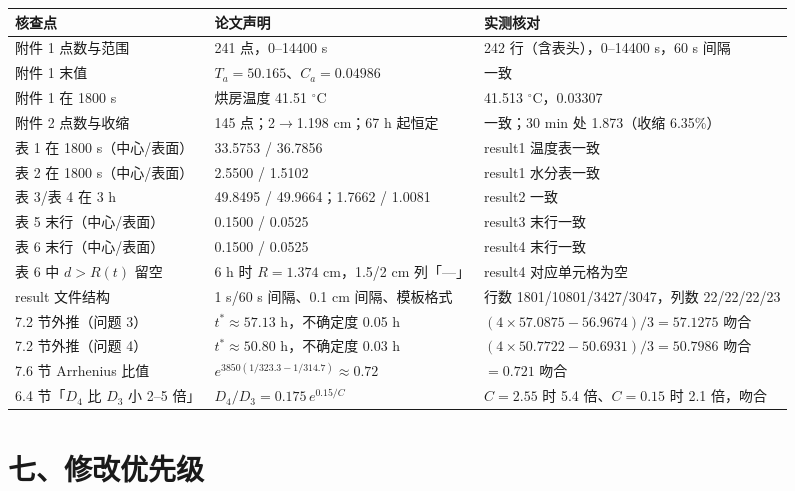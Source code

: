 \documentclass[12pt,a4paper]{ctexart}
\begin{document}
\begin{center}
{\begin{tabular}{p{6.6cm}ll}
\toprule
核查点 & 论文声明 & 实测核对 \\
\midrule
附件 1 点数与范围 & 241 点，0--14400 s & 242 行（含表头），0--14400 s，60 s 间隔 \\
附件 1 末值 & $T_a=50.165$、$C_a=0.04986$ & 一致 \\
附件 1 在 1800 s & 烘房温度 41.51 $^\circ$C & 41.513 $^\circ$C，0.03307 \\
附件 2 点数与收缩 & 145 点；2$\to$1.198 cm；67 h 起恒定 & 一致；30 min 处 1.873（收缩 6.35\%） \\
表 1 在 1800 s（中心/表面） & 33.5753 / 36.7856 & result1 温度表一致 \\
表 2 在 1800 s（中心/表面） & 2.5500 / 1.5102 & result1 水分表一致 \\
表 3/表 4 在 3 h & 49.8495 / 49.9664；1.7662 / 1.0081 & result2 一致 \\
表 5 末行（中心/表面） & 0.1500 / 0.0525 & result3 末行一致 \\
表 6 末行（中心/表面） & 0.1500 / 0.0525 & result4 末行一致 \\
表 6 中 $d>R(t)$ 留空 & 6 h 时 $R=1.374$ cm，1.5/2 cm 列「---」 & result4 对应单元格为空 \\
result 文件结构 & 1 s/60 s 间隔、0.1 cm 间隔、模板格式 & 行数 1801/10801/3427/3047，列数 22/22/22/23 \\
7.2 节外推（问题 3） & $t^*\approx57.13$ h，不确定度 0.05 h & $(4\times57.0875-56.9674)/3=57.1275$ 吻合 \\
7.2 节外推（问题 4） & $t^*\approx50.80$ h，不确定度 0.03 h & $(4\times50.7722-50.6931)/3=50.7986$ 吻合 \\
7.6 节 Arrhenius 比值 & $e^{3850(1/323.3-1/314.7)}\approx0.72$ & $=0.721$ 吻合 \\
6.4 节「$D_4$ 比 $D_3$ 小 2--5 倍」 & $D_4/D_3=0.175\,e^{0.15/C}$ & $C=2.55$ 时 5.4 倍、$C=0.15$ 时 2.1 倍，吻合 \\
\bottomrule
\end{tabular}}
\end{center}

\section{七、修改优先级}
\end{document}
